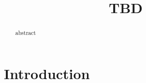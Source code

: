 \documentclass[12pt]{article}
\newcommand{\1}{\mathbf{1}}
\theoremstyle{plain}
\theoremstyle{definition}
\theoremstyle{remark}
\theoremstyle{plain}
\theoremstyle{remark}
\theoremstyle{plain}
\theoremstyle{plain}
\begin{document}


\title{TBD}
%
%

\maketitle



\begin{abstract}
abstract
\end{abstract}

\section{Introduction}
\end{document}
